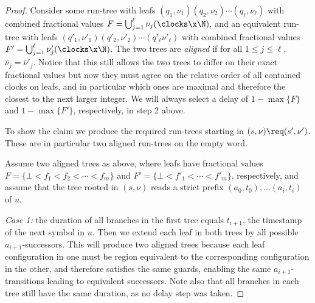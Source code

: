 \begin{proof}
    Consider some run-tree with leafs
    $(q_1,\nu_1)(q_2,\nu_2)\cdots(q_\ell,\nu_\ell)$
    with combined fractional values $F=\bigcup_{j=1}^\ell\nu_j(\clocks\x\N)$,
    and an equivalent run-tree with leafs
    $(q'_1,\nu'_1)(q'_2,\nu'_2)\cdots(q'_\ell\nu'_\ell)$
    with combined fractional values $F'=\bigcup_{j=1}^\ell\nu_j'(\clocks\x\N)$.
    The two trees are \emph{aligned} if
    for all $1\le j \le \ell$, $\hat{\nu}_j = \hat{\nu}'_j$.
    Notice that this still allows the two trees to differ on their exact fractional values
    but now they must agree on the relative order of all contained clocks on leafs, and in particular which ones are maximal and therefore the closest to the next larger integer.
    We will always select a delay of $1-\max\{F\}$ and $1-\max\{F'\}$, respectively, in step 2 above.

    To show the claim we produce the required run-trees starting in $(s,\nu)\req(s',\nu')$.
    These are in particular two aligned run-trees on the empty word.
    
    Assume two aligned trees as above,
    where leafs have fractional values
    $F=\{\bot<f_1<f_2<\cdots<f_m\}$ and 
    $F'=\{\bot<f'_1<\cdots<f'_m\}$, respectively,
    and assume 
    that the tree rooted in $(s,\nu)$ reads a strict prefix $(a_0,t_0),\ldots (a_i,t_i)$ of $u$.
    
    \smallskip
    \emph{Case 1: } the duration of all branches in the first tree equals $t_{i+1}$, the timestamp of the next symbol in $u$.
    Then we extend each leaf in both trees by all possible $a_{i+1}$-successors.
    This will produce two aligned trees because
    each leaf configuration in one must be region equivalent to the corresponding configuration in the other,
    and therefore satisfies the same guards, enabling the same $a_{i+1}$-transitions leading to equivalent successors. Note also that all branches in each tree still have the same duration, as no delay step was taken.


\end{proof}
